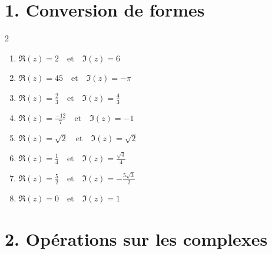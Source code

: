 
\section*{1. Conversion de formes}
\begin{solution}
    \text{ }

    \begin{multicols}{2}
    \begin{enumerate}[label=(\alph*)]
        \item $\Re(z) = 2 \quad \text{et} \quad \Im(z) = 6$
        \item $\Re(z) = 45 \quad \text{et} \quad \Im(z) = -\pi$
        \item $\Re(z) = \frac{2}{3} \quad \text{et} \quad \Im(z) = \frac{4}{3}$
        \item $\Re(z) = \frac{-12}{7} \quad \text{et} \quad \Im(z) = -1$
        \item $\Re(z) = \sqrt{2} \quad \text{et} \quad \Im(z) = \sqrt{2}$
        \item $\Re(z) = \frac{1}{4} \quad \text{et} \quad \Im(z) = \frac{\sqrt{3}}{4}$
        \item $\Re(z) = \frac{5}{2} \quad \text{et} \quad \Im(z) = - \frac{5\sqrt{3}}{2}$
        \item $\Re(z) = 0 \quad \text{et} \quad \Im(z) = 1$
    \end{enumerate}
    \end{multicols}
\end{solution}

\section*{2. Opérations sur les complexes}

